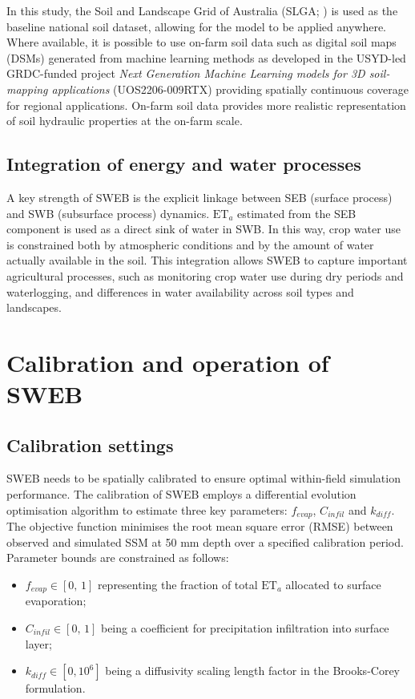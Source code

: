 \documentclass[11pt,a4paper]{article}
\begin{document}
In this study, the Soil and Landscape Grid of Australia (SLGA; \citealp{malone_updating_2021,malone_updating_2021b}) is used as the baseline national soil dataset, allowing for the model to be applied anywhere. Where available, it is possible to use on-farm soil data such as digital soil maps (DSMs) generated from machine learning methods as developed in the USYD-led GRDC-funded project \emph{Next Generation Machine Learning models for 3D soil-mapping applications} (UOS2206-009RTX) providing spatially continuous coverage for regional applications. On-farm soil data provides more realistic representation of soil hydraulic properties at the on-farm scale.

\subsection{Integration of energy and water processes}

A key strength of SWEB is the explicit linkage between SEB (surface process) and SWB (subsurface process) dynamics. $\mathrm{ET}_{a}$ estimated from the SEB component is used as a direct sink of water in SWB. In this way, crop water use is constrained both by atmospheric conditions and by the amount of water actually available in the soil. This integration allows SWEB to capture important agricultural processes, such as monitoring crop water use during dry periods and waterlogging, and differences in water availability across soil types and landscapes.

\section{Calibration and operation of SWEB}

\subsection{Calibration settings}

SWEB needs to be spatially calibrated to ensure optimal within-field simulation performance. The calibration of SWEB employs a differential evolution optimisation algorithm to estimate three key parameters: $f_{evap}$, $C_{infil}$ and $k_{diff}$. The objective function minimises the root mean square error (RMSE) between observed and simulated SSM at 50 mm depth over a specified calibration period. Parameter bounds are constrained as follows:

\begin{itemize}
\item $f_{evap} \in [0,\,1]$ representing the fraction of total $\mathrm{ET}_{a}$ allocated to surface evaporation;
\item $C_{infil} \in [0,\,1]$ being a coefficient for precipitation infiltration into surface layer;
\item $k_{diff} \in [0,10^{6}]$ being a diffusivity scaling length factor in the Brooks-Corey formulation.
\end{itemize}
\end{document}
